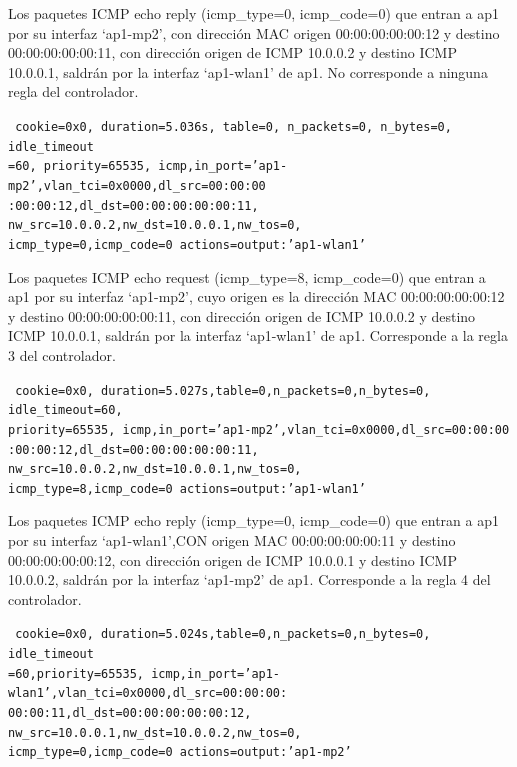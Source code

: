 \documentclass[a4paper,12pt,twoside,spanish]{book}
\begin{document}
Los paquetes ICMP echo reply (icmp\_type=0, icmp\_code=0) que entran a ap1 por su interfaz ‘ap1-mp2’, con dirección MAC origen 00:00:00:00:00:12 y destino 00:00:00:00:00:11, con dirección origen de ICMP 10.0.0.2 y destino ICMP 10.0.0.1, saldrán por la interfaz ‘ap1-wlan1’ de ap1. No corresponde a ninguna regla del  controlador.\par 

\noindent\texttt{
	cookie=0x0, duration=5.036s, table=0, n\_packets=0, n\_bytes=0, idle\_timeout\\
	=60, priority=65535,
	icmp,in\_port='ap1-mp2',vlan\_tci=0x0000,dl\_src=00:00:00\\
	:00:00:12,dl\_dst=00:00:00:00:00:11,
	nw\_src=10.0.0.2,nw\_dst=10.0.0.1,nw\_tos=0,\\
	icmp\_type=0,icmp\_code=0 actions=output:'ap1-wlan1'
}

Los paquetes ICMP echo request (icmp\_type=8, icmp\_code=0) que entran a ap1 por su interfaz ‘ap1-mp2’, cuyo origen es la dirección MAC 00:00:00:00:00:12 y destino 00:00:00:00:00:11, con dirección origen de ICMP 10.0.0.2 y destino ICMP 10.0.0.1, saldrán por la interfaz ‘ap1-wlan1’ de ap1. Corresponde a la regla 3 del controlador.\par 

\noindent\texttt{
	cookie=0x0, duration=5.027s,table=0,n\_packets=0,n\_bytes=0, idle\_timeout=60,\\
	priority=65535,
	icmp,in\_port='ap1-mp2',vlan\_tci=0x0000,dl\_src=00:00:00\\
	:00:00:12,dl\_dst=00:00:00:00:00:11,
	nw\_src=10.0.0.2,nw\_dst=10.0.0.1,nw\_tos=0,\\
	icmp\_type=8,icmp\_code=0 actions=output:'ap1-wlan1'
}

Los paquetes ICMP echo reply (icmp\_type=0, icmp\_code=0) que entran a ap1 por su interfaz ‘ap1-wlan1’,CON origen MAC 00:00:00:00:00:11 y destino 00:00:00:00:00:12, con dirección origen de ICMP 10.0.0.1 y destino ICMP 10.0.0.2, saldrán por la interfaz ‘ap1-mp2’ de ap1. Corresponde a la regla 4 del controlador. \par 

\noindent\texttt{
	cookie=0x0, duration=5.024s,table=0,n\_packets=0,n\_bytes=0, idle\_timeout\\
	=60,priority=65535,
	icmp,in\_port='ap1-wlan1',vlan\_tci=0x0000,dl\_src=00:00:00:\\
	00:00:11,dl\_dst=00:00:00:00:00:12,
	nw\_src=10.0.0.1,nw\_dst=10.0.0.2,nw\_tos=0,\\
	icmp\_type=0,icmp\_code=0 actions=output:'ap1-mp2'
}
\end{document}
